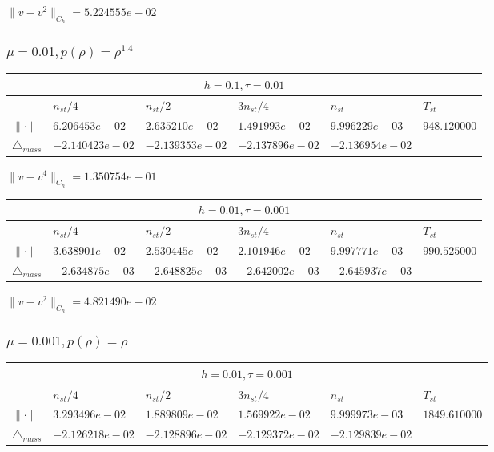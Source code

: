 $\|v-v^{2}\|_{C_h} = 5.224555e-02$

\subsubsection{$\mu = 0.01, p(\rho) = \rho^{1.4} $}

\begin{tabular}{*{6}{|l}|}
    \hline
     \\
    \hline
    &$n_{st}/4 $&$ n_{st}/2$&$3n_{st}/4$&$n_{st}$&$T_{st}$ \\
    \hline$\|\cdot \|$& $6.206453e-02$ & $2.635210e-02$ & $1.491993e-02$ & $9.996229e-03$ &$948.120000$\\
\hline
$\triangle_{mass}$& $-2.140423e-02$ & $-2.139353e-02$ & $-2.137896e-02$ & $-2.136954e-02$ &\\
\hline
\end{tabular}
$\|v-v^{4}\|_{C_h} = 1.350754e-01$

\begin{tabular}{*{6}{|l}|}
    \hline
     \\
    \hline
    &$n_{st}/4 $&$ n_{st}/2$&$3n_{st}/4$&$n_{st}$&$T_{st}$ \\
    \hline$\|\cdot \|$& $3.638901e-02$ & $2.530445e-02$ & $2.101946e-02$ & $9.997771e-03$ &$990.525000$\\
\hline
$\triangle_{mass}$& $-2.634875e-03$ & $-2.648825e-03$ & $-2.642002e-03$ & $-2.645937e-03$ &\\
\hline
\end{tabular}

$\|v-v^{2}\|_{C_h} = 4.821490e-02$

\subsubsection{$\mu = 0.001, p(\rho) = \rho $}

\begin{tabular}{*{6}{|l}|}
    \hline
     \\
    \hline
    &$n_{st}/4 $&$ n_{st}/2$&$3n_{st}/4$&$n_{st}$&$T_{st}$ \\
    \hline$\|\cdot \|$& $3.293496e-02$ & $1.889809e-02$ & $1.569922e-02$ & $9.999973e-03$ &$1849.610000$\\
\hline
$\triangle_{mass}$& $-2.126218e-02$ & $-2.128896e-02$ & $-2.129372e-02$ & $-2.129839e-02$ &\\
\hline
\end{tabular}

